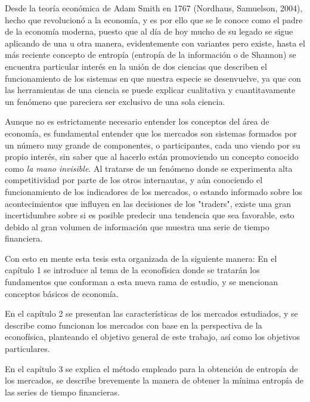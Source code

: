 Desde la teor\'ia econ\'omica de Adam Smith en 1767 (Nordhaus, Samuelson, 2004), hecho que revolucion\'o a la econom\'ia, y es por ello que se le conoce como el padre de la econom\'ia moderna, puesto que al d\'ia de hoy mucho de su legado se sigue aplicando de una u otra manera, evidentemente con variantes pero existe, hasta el más reciente concepto de entropía (entropía de la información o de Shannon) se encuentra particular interés en la unión de dos ciencias que describen el funcionamiento de los sistemas en que nuestra especie se desenvuelve, ya que con las herramientas de una ciencia se puede explicar cualitativa y cuantitavamente un fenómeno que pareciera ser exclusivo de una sola ciencia.
\newline

\hspace{1cm}Aunque no es estrictamente necesario entender los conceptos del \'area de econom\'ia, es fundamental entender que los mercados son sistemas formados por un n\'umero muy grande de componentes, o participantes, cada uno viendo por su propio inter\'es, sin saber que al hacerlo est\'an promoviendo un concepto conocido como \textit{la mano invisible}. Al tratarse de un fen\'omeno donde se experimenta alta competitividad por parte de los otros internautas, y a\'un conociendo el funcionamiento de los indicadores de los mercados, o estando informado sobre los acontecimientos que influyen en las decisiones de los "traders", existe una gran incertidumbre sobre si es posible predecir una tendencia que sea favorable, esto debido al gran volumen de información que muestra una serie de tiempo financiera. 
\newline

Con esto en mente esta tesis esta organizada de la siguiente manera:\newline 
En el capítulo 1 se introduce al tema de la econofísica donde se tratarán los fundamentos que conforman a esta nueva rama de estudio, y se mencionan conceptos básicos de economía.
\newline

En el capítulo 2 se presentan las características de los mercados estudiados, y se describe como funcionan los mercados con base en la perspectiva de la econofísica, planteando el objetivo general de este trabajo, así como los objetivos particulares.\newline

En el capítulo 3 se explica el método empleado para la obtención de entropía de los mercados, se describe brevemente la manera de obtener la mínima entropía de las series de tiempo financieras.
\newline

